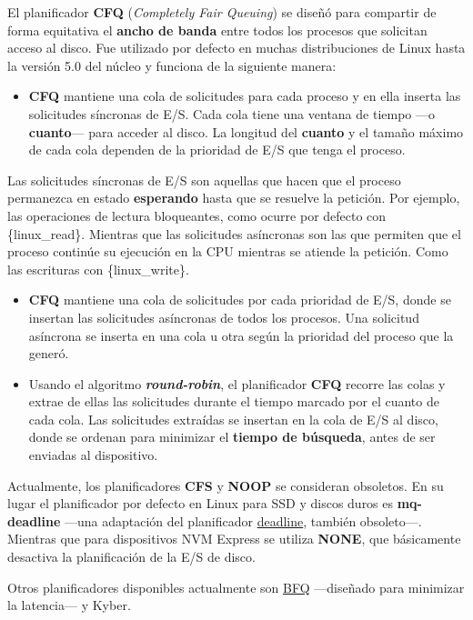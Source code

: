 {} El planificador \textbf{{}CFQ} (\emph{Completely Fair Queuing}) se
diseñó para compartir de forma equitativa el \textbf{ancho de banda}
entre todos los procesos que solicitan acceso al disco. Fue utilizado
por defecto en muchas distribuciones de Linux hasta la versión 5.0 del
núcleo y funciona de la siguiente manera:

\begin{itemize}
\item
  \textbf{CFQ} mantiene una cola de solicitudes para cada proceso y en
  ella inserta las solicitudes síncronas de E/S. Cada cola tiene una
  ventana de tiempo ---o \textbf{cuanto}--- para acceder al disco. La
  longitud del \textbf{cuanto} y el tamaño máximo de cada cola dependen
  de la prioridad de E/S que tenga el proceso.
\end{itemize}

Las solicitudes síncronas de E/S son aquellas que hacen que el proceso
permanezca en estado \textbf{esperando} hasta que se resuelve la
petición. Por ejemplo, las operaciones de lectura bloqueantes, como
ocurre por defecto con \{linux\_read\}. Mientras que las solicitudes
asíncronas son las que permiten que el proceso continúe su ejecución en
la CPU mientras se atiende la petición. Como las escrituras con
\{linux\_write\}.

\begin{itemize}
\item
  \textbf{CFQ} mantiene una cola de solicitudes por cada prioridad de
  E/S, donde se insertan las solicitudes asíncronas de todos los
  procesos. Una solicitud asíncrona se inserta en una cola u otra según
  la prioridad del proceso que la generó.
\item
  Usando el algoritmo \textbf{\emph{round-robin}}, el planificador
  \textbf{CFQ} recorre las colas y extrae de ellas las solicitudes
  durante el tiempo marcado por el cuanto de cada cola. Las solicitudes
  extraídas se insertan en la cola de E/S al disco, donde se ordenan
  para minimizar el \textbf{tiempo de búsqueda}, antes de ser enviadas
  al dispositivo.
\end{itemize}

Actualmente, los planificadores \textbf{CFS} y \textbf{NOOP} se
consideran obsoletos. En su lugar el planificador por defecto en Linux
para SSD y discos duros es \textbf{mq-deadline} ---una adaptación del
planificador
\href{https://en.wikipedia.org/wiki/Deadline_scheduler}{deadline},
también obsoleto---. Mientras que para dispositivos NVM Express se
utiliza \textbf{NONE}, que básicamente desactiva la planificación de la
E/S de disco.

Otros planificadores disponibles actualmente son
\href{https://algo.ing.unimo.it/people/paolo/disk_sched/}{BFQ}
---diseñado para minimizar la latencia--- y Kyber.
